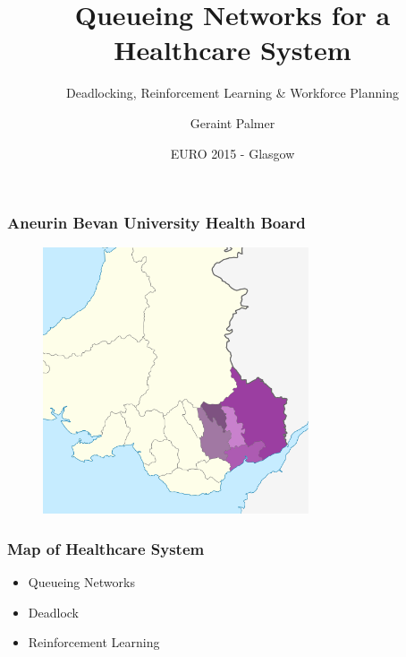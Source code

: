 \documentclass{beamer}
\title
{Queueing Networks for a Healthcare System}
\subtitle
{Deadlocking, Reinforcement Learning \& Workforce Planning}
\author{Geraint Palmer}
\date{EURO 2015 - Glasgow}
\begin{document}
\frame{\titlepage}


\begin{frame}
\frametitle{Aneurin Bevan University Health Board}
\begin{figure}
\includegraphics[width=0.7\textwidth]{Aneurin_Bevan}
\end{figure}
\end{frame}

\begin{frame}
\frametitle{Map of Healthcare System}
\begin{figure}

\end{figure}
\end{frame}

\begin{frame}
    
\end{frame}

\begin{frame}
    
\end{frame}

\begin{frame}
    \begin{itemize}
        \item Queueing Networks
        \item Deadlock
        \item Reinforcement Learning
    \end{itemize}
\end{frame}
\end{document}
